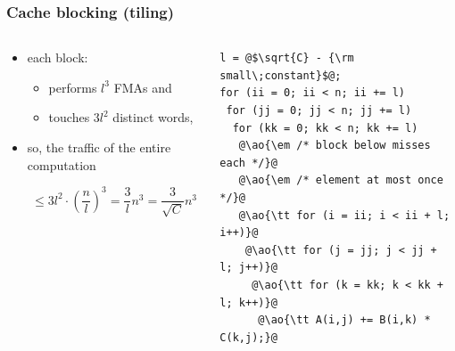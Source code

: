 \documentclass[12pt,dvipdfmx]{beamer}
\newcommand{\ao}[1]{{\color{blue}#1}}
\begin{document}
\begin{frame}[fragile]
  \frametitle{Cache blocking (tiling)}
\begin{columns}
\begin{column}{0.55\textwidth}
\begin{itemize}
\item<1-> each block:
  \begin{itemize}
  \item performs \ao{$l^3$} FMAs and
  \item touches \ao{$3l^2$} distinct words,
  \end{itemize}

\item<2-> so, the traffic of the entire computation

\[ \leq 3l^2 \cdot \left(\frac{n}{l}\right)^3 = \frac{3}{l}n^3 = \frac{3}{\sqrt{C}}n^3 \]

\end{itemize}
\end{column}

\begin{column}{0.45\textwidth}
\begin{lstlisting}
l = @$\sqrt{C} - {\rm small\;constant}$@;
for (ii = 0; ii < n; ii += l)
 for (jj = 0; jj < n; jj += l)
  for (kk = 0; kk < n; kk += l)
   @\ao{\em /* block below misses each */}@
   @\ao{\em /* element at most once */}@
   @\ao{\tt for (i = ii; i < ii + l; i++)}@
    @\ao{\tt for (j = jj; j < jj + l; j++)}@
     @\ao{\tt for (k = kk; k < kk + l; k++)}@
      @\ao{\tt A(i,j) += B(i,k) * C(k,j);}@
\end{lstlisting}
\end{column}
\end{columns}
\end{frame}


\end{document}
